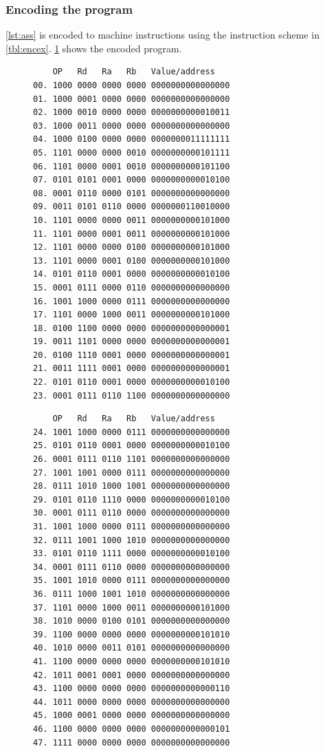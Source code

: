 \documentclass[a4paper, english]{article}
\numberwithin{equation}{section}
\begin{document}
\subsubsection{Encoding the program}
\cref{lst:ass} is encoded to machine instructions using the instruction scheme in \cref{tbl:encex}. \cref{lst:machine} shows the encoded program.
\begin{figure}
    \label{lst:machine}
    \begin{minipage}{0.49\textwidth}
        \vspace{1.5em}
        \centering
        \begin{verbatim}
    OP   Rd   Ra   Rb   Value/address
00. 1000 0000 0000 0000 0000000000000000
01. 1000 0001 0000 0000 0000000000000000
02. 1000 0010 0000 0000 0000000000010011
03. 1000 0011 0000 0000 0000000000000000
04. 1000 0100 0000 0000 0000000011111111
05. 1101 0000 0000 0010 0000000000101111
06. 1101 0000 0001 0010 0000000000101100
07. 0101 0101 0001 0000 0000000000010100
08. 0001 0110 0000 0101 0000000000000000
09. 0011 0101 0110 0000 0000000110010000
10. 1101 0000 0000 0011 0000000000101000
11. 1101 0000 0001 0011 0000000000101000
12. 1101 0000 0000 0100 0000000000101000
13. 1101 0000 0001 0100 0000000000101000
14. 0101 0110 0001 0000 0000000000010100
15. 0001 0111 0000 0110 0000000000000000
16. 1001 1000 0000 0111 0000000000000000
17. 1101 0000 1000 0011 0000000000101000
18. 0100 1100 0000 0000 0000000000000001
19. 0011 1101 0000 0000 0000000000000001
20. 0100 1110 0001 0000 0000000000000001
21. 0011 1111 0001 0000 0000000000000001
22. 0101 0110 0001 0000 0000000000010100
23. 0001 0111 0110 1100 0000000000000000
    \end{verbatim}
    \end{minipage}
    \begin{minipage}{0.49\textwidth}
        \vspace{1.5em}
        \centering
        \begin{verbatim}
    OP   Rd   Ra   Rb   Value/address
24. 1001 1000 0000 0111 0000000000000000
25. 0101 0110 0001 0000 0000000000010100
26. 0001 0111 0110 1101 0000000000000000
27. 1001 1001 0000 0111 0000000000000000
28. 0111 1010 1000 1001 0000000000000000
29. 0101 0110 1110 0000 0000000000010100
30. 0001 0111 0110 0000 0000000000000000
31. 1001 1000 0000 0111 0000000000000000
32. 0111 1001 1000 1010 0000000000000000
33. 0101 0110 1111 0000 0000000000010100
34. 0001 0111 0110 0000 0000000000000000
35. 1001 1010 0000 0111 0000000000000000
36. 0111 1000 1001 1010 0000000000000000
37. 1101 0000 1000 0011 0000000000101000
38. 1010 0000 0100 0101 0000000000000000
39. 1100 0000 0000 0000 0000000000101010
40. 1010 0000 0011 0101 0000000000000000
41. 1100 0000 0000 0000 0000000000101010
42. 1011 0001 0001 0000 0000000000000000
43. 1100 0000 0000 0000 0000000000000110
44. 1011 0000 0000 0000 0000000000000000
45. 1000 0001 0000 0000 0000000000000000
46. 1100 0000 0000 0000 0000000000000101
47. 1111 0000 0000 0000 0000000000000000
     \end{verbatim}
    \end{minipage}
\end{figure}
\end{document}
